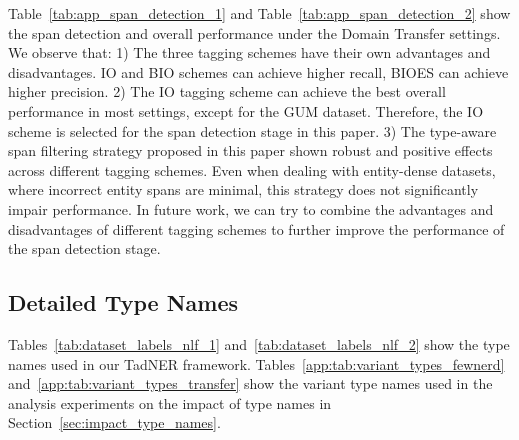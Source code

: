 \documentclass[11pt]{article}
\newcommand{\ours}{{TadNER}\xspace}
\begin{document}
Table~\ref{tab:app_span_detection_1} and Table~\ref{tab:app_span_detection_2} show the span detection and overall performance under the Domain Transfer settings.
We observe that: 
1) The three tagging schemes have their own advantages and disadvantages. IO and BIO schemes can achieve higher recall, BIOES can achieve higher precision. 
2) The IO tagging scheme can achieve the best overall performance in most settings, except for the GUM dataset. 
Therefore, the IO scheme is selected for the span detection stage in this paper.	
3) The type-aware span filtering strategy proposed in this paper shown robust and positive effects across different tagging schemes.
Even when dealing with entity-dense datasets, where incorrect entity spans are minimal, this strategy does not significantly impair performance.
In future work, we can try to combine the advantages and disadvantages of different tagging schemes to further improve the performance of the span detection stage.





\subsection{Detailed Type Names}\label{appendix_type_names}

Tables~\ref{tab:dataset_labels_nlf_1} and~\ref{tab:dataset_labels_nlf_2} show the type names used in our \ours framework.
Tables~\ref{app:tab:variant_types_fewnerd} and~\ref{app:tab:variant_types_transfer} show the variant type names used in the analysis experiments on the impact of type names in Section~\ref{sec:impact_type_names}.

\clearpage
\end{document}
